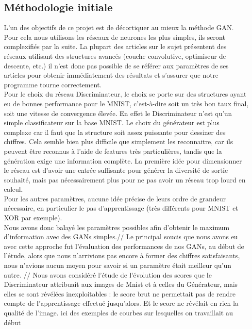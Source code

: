	\subsection{Méthodologie initiale}
		L'un des objectifs de ce projet est de décortiquer au mieux la méthode GAN. Pour cela nous utilisons les réseaux de neurones les plus simples, ils seront complexifiés par la suite. La plupart des articles sur le sujet présentent des réseaux utilisant des structures avancés (couche convolutive, optimiseur de descente, etc.) il n'est donc pas possible de se référer aux paramètres de ses articles pour obtenir immédiatement des résultats et s'assurer que notre programme tourne correctement. \\
		Pour le choix du réseau Discriminateur, le choix se porte sur des structures ayant eu de bonnes performance pour le MNIST, c'est-à-dire soit un très bon taux final, soit une vitesse de convergence élevée. En effet le Discriminateur n'est qu'un simple classificateur sur la base MNIST. Le choix du générateur est plus complexe car il faut que la structure soit assez puissante pour dessiner des chiffres. Cela semble bien plus difficile que simplement les reconnaitre, car ils peuvent être reconnus à l'aide de features très particulières, tandis que la génération exige une information complète. La première idée pour dimensionner le réseau est d'avoir une entrée suffisante pour générer la diversité de sortie souhaité, mais pas nécessairement plus pour ne pas avoir un réseau trop lourd en calcul.\\
		Pour les autres paramètres, aucune idée précise de leurs ordre de grandeur nécessaire, en particulier le pas d'apprentissage (très différents pour MNIST et XOR par exemple).\\
		Nous avons donc balayé les paramètres possibles afin d'obtenir le maximum d'information avec des GANs simples.//
		Le principal soucis que nous avons eu avec cette approche fut l'évaluation des performances de nos GANs, au début de l'étude, alors que nous n'arrivions pas encore à former des chiffres satisfaisants, nous n'avions aucun moyen pour savoir si un paramètre était meilleur qu'un autre. //
		Nous avons considéré l'étude de l'évolution des scores que le Discriminateur attribuait aux images de Mnist et à celles du Générateur, mais elles se sont révélées inexploitables : le score brut ne permettait pas de rendre compte de l'apprentissage effectué jusqu'alors. Et le score ne révélait en rien la qualité de l'image. 
{ici des exemples de courbes sur lesquelles on travaillait au début } 




